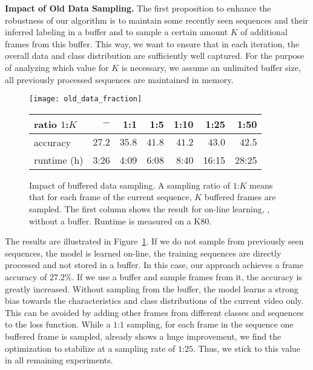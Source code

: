 \documentclass[10pt,twocolumn,letterpaper]{article}
\begin{document}
\textbf{Impact of Old Data Sampling.}
The first proposition to enhance the robustness of our algorithm is to maintain
some recently seen sequences and their inferred labeling in a buffer and to sample
a certain amount $ K $ of additional frames from this buffer. This way, we want
to ensure that in each iteration, the overall data and class distribution are
sufficiently well captured. For the purpose of analyzing which value for $ K $
is necessary, we assume an unlimited buffer size, \ie all previously processed
sequences are maintained in memory.
\begin{figure}[tb]
    \centering
    \texttt{[image: old\_data\_fraction]}
    \footnotesize
    \begin{tabularx}{0.48\textwidth}{Xrrrrrr}
        \toprule
            ratio $1$:$K$    & $ - $    & 1:1      & 1:5      & 1:10     & 1:25     & 1:50     \\
        \midrule
            accuracy         & $ 27.2 $ & $ 35.8 $ & $ 41.8 $ & $ 41.2 $ & $ 43.0 $ & $ 42.5 $ \\
            runtime (h)      & 3:26     & 4:09     & 6:08     & 8:40     & 16:15   & 28:25     \\
        \bottomrule
    \end{tabularx}
    \caption{\label{fig:bufferedDataSampling}
		Impact of buffered data sampling. A sampling ratio of $1$:$K$ means that for each frame of
             the current sequence, $ K $ buffered frames are sampled.
             The first column shows the result for on-line learning, \ie, without a buffer.
             Runtime is measured on a K80.}
    \vspace{-0.5cm}
\end{figure}
The results are illustrated in Figure~\ref{fig:bufferedDataSampling}.
If we do not sample from previously seen sequences, the model is learned on-line, \ie the training sequences are directly processed and not stored in a buffer. In this case, our approach achieves a frame accuracy of $27.2\%$. If we use a buffer and sample frames from it, the accuracy is greatly increased. 
Without sampling from the buffer, the model learns a strong bias towards the characteristics
and class distributions of the current video only. This can be avoided by adding
other frames from different classes and sequences to the loss function. While a
$1$:$1$ sampling, \ie for each frame in the sequence one buffered frame is sampled,
already shows a huge improvement, we find the optimization to stabilize at a sampling rate
of $1$:$25$. Thus, we stick to this value in all remaining experiments.
 
\end{document}
